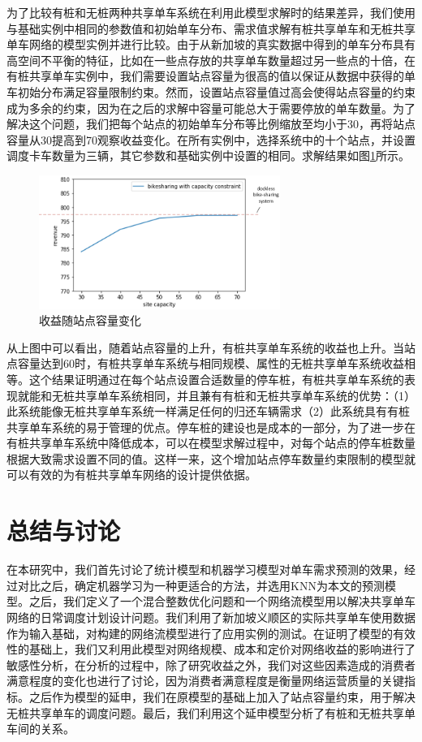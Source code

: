 \documentclass[]{tongjithesis}
\numberwithin{equation}{chapter}
\begin{document}
为了比较有桩和无桩两种共享单车系统在利用此模型求解时的结果差异，我们使用与基础实例中相同的参数值和初始单车分布、需求值求解有桩共享单车和无桩共享单车网络的模型实例并进行比较。由于从新加坡的真实数据中得到的单车分布具有高空间不平衡的特征，比如在一些点存放的共享单车数量超过另一些点的十倍，在有桩共享单车实例中，我们需要设置站点容量为很高的值以保证从数据中获得的单车初始分布满足容量限制约束。然而，设置站点容量值过高会使得站点容量的约束成为多余的约束，因为在之后的求解中容量可能总大于需要停放的单车数量。为了解决这个问题，我们把每个站点的初始单车分布等比例缩放至均小于30，再将站点容量从30提高到70观察收益变化。在所有实例中，选择系统中的十个站点，并设置调度卡车数量为三辆，其它参数和基础实例中设置的相同。求解结果如图\ref{revenue_cap}所示。
\begin{figure}[H]
    \centering
    \includegraphics[width=0.7\textwidth]{figures_main/revenue_change_with_capacity.png}
    \caption{收益随站点容量变化}
    \label{revenue_cap}
\end{figure}

从上图中可以看出，随着站点容量的上升，有桩共享单车系统的收益也上升。当站点容量达到60时，有桩共享单车系统与相同规模、属性的无桩共享单车系统收益相等。这个结果证明通过在每个站点设置合适数量的停车桩，有桩共享单车系统的表现就能和无桩共享单车系统相同，并且兼有有桩和无桩共享单车系统的优势：（1）此系统能像无桩共享单车系统一样满足任何的归还车辆需求（2）此系统具有有桩共享单车系统的易于管理的优点。停车桩的建设也是成本的一部分，为了进一步在有桩共享单车系统中降低成本，可以在模型求解过程中，对每个站点的停车桩数量根据大致需求设置不同的值。这样一来，这个增加站点停车数量约束限制的模型就可以有效的为有桩共享单车网络的设计提供依据。
\clearpage
\chapter{总结与讨论}
在本研究中，我们首先讨论了统计模型和机器学习模型对单车需求预测的效果，经过对比之后，确定机器学习为一种更适合的方法，并选用KNN为本文的预测模型。之后，我们定义了一个混合整数优化问题和一个网络流模型用以解决共享单车网络的日常调度计划设计问题。我们利用了新加坡义顺区的实际共享单车使用数据作为输入基础，对构建的网络流模型进行了应用实例的测试。在证明了模型的有效性的基础上，我们又利用此模型对网络规模、成本和定价对网络收益的影响进行了敏感性分析，在分析的过程中，除了研究收益之外，我们对这些因素造成的消费者满意程度的变化也进行了讨论，因为消费者满意程度是衡量网络运营质量的关键指标。之后作为模型的延申，我们在原模型的基础上加入了站点容量约束，用于解决无桩共享单车的调度问题。最后，我们利用这个延申模型分析了有桩和无桩共享单车间的关系。
\end{document}

